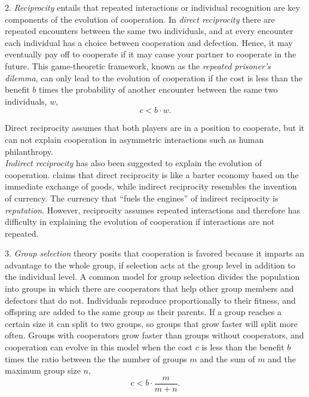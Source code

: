 \documentclass[12pt]{extarticle}
\begin{document}
2. \emph{Reciprocity} entails that repeated interactions or individual recognition are key components of the evolution of cooperation. In \emph{direct reciprocity} there are repeated encounters between the same two individuals, and at every encounter each individual has a choice between cooperation and defection. Hence, it may eventually pay off to cooperate if it may cause your partner to cooperate in the future.
This game-theoretic framework, known as the \emph{repeated prisoner's dilemma}, 
can only lead to the evolution of cooperation if the cost is less than the benefit $b$ times the probability of another encounter between the same two individuals, $w$, 
\begin{equation} \label{eq:reciprocity}
c < b \cdot w.
\end{equation}

Direct reciprocity assumes that both players are in a position to cooperate, but it can not explain cooperation in asymmetric interactions such as human philanthropy. \\
\emph{Indirect reciprocity} has also been suggested to explain the evolution of cooperation.
\citet{nowak2006five} claims that direct reciprocity is like a barter economy based on the immediate exchange of goods, while indirect reciprocity resembles the invention of currency. 
The currency that ``fuels the engines'' of indirect reciprocity is \emph{reputation}. 
However, reciprocity assumes repeated interactions and therefore has difficulty in explaining the evolution of cooperation if  interactions are not repeated. 

3. \emph{Group selection} theory posits that cooperation is favored because it imparts an advantage to the whole group, if selection acts at the group level in addition to the individual level. A common model for group selection divides the population into groups in which there are cooperators that help  other group members and defectors that do not.  %
Individuals reproduce proportionally to their fitness, and offspring are added to the same group as their parents.
If a group reaches a certain size it can split to two groups, so groups that grow faster will split more often.
Groups with cooperators grow faster than groups without cooperators, and
cooperation can evolve in this model when the cost $c$ is less than the benefit $b$ times the ratio between the  the number of groups $m$ and the sum of $m$ and the maximum group size $n$,
\begin{equation} \label{eq:groupselection}
c < b \cdot \frac{m}{m+n} .
\end{equation}
\end{document}
